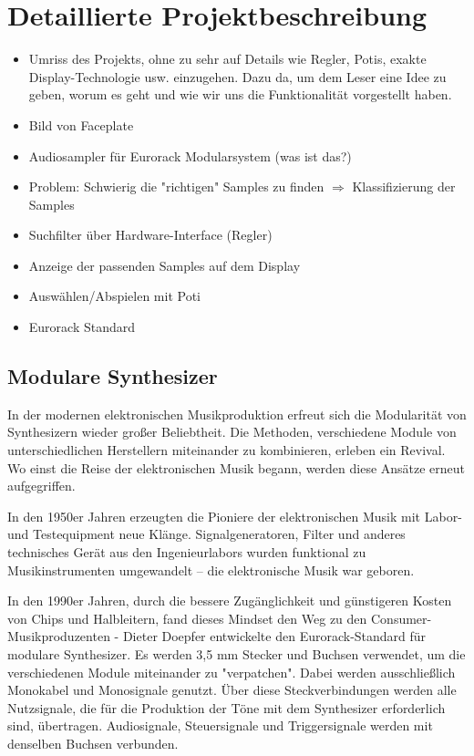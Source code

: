 \newpage
\section{Detaillierte Projektbeschreibung}
\begin{itemize}
    \item Umriss des Projekts, ohne zu sehr auf Details wie Regler, Potis, exakte Display-Technologie usw. einzugehen. Dazu da, um dem Leser eine Idee zu geben, worum es geht und wie wir uns die Funktionalität vorgestellt haben.
    \item Bild von Faceplate
    \item Audiosampler für Eurorack Modularsystem (was ist das?)
    \item Problem: Schwierig die "richtigen" Samples zu finden $\Rightarrow$ Klassifizierung der Samples
    \item Suchfilter über Hardware-Interface (Regler)
    \item Anzeige der passenden Samples auf dem Display
    \item Auswählen/Abspielen mit Poti
    \item Eurorack Standard
\end{itemize}

	\subsection{Modulare Synthesizer}
	
	In der modernen elektronischen Musikproduktion erfreut sich die Modularität von Synthesizern wieder großer Beliebtheit. 
	Die Methoden, verschiedene Module von unterschiedlichen Herstellern miteinander zu kombinieren, erleben ein Revival. 
	Wo einst die Reise der elektronischen Musik begann, werden diese Ansätze erneut aufgegriffen.
	
	In den 1950er Jahren erzeugten die Pioniere der elektronischen Musik mit Labor- und Testequipment neue Klänge. 
	Signalgeneratoren, Filter und anderes technisches Gerät aus den Ingenieurlabors wurden funktional zu Musikinstrumenten umgewandelt – die elektronische Musik war geboren.
	
	In den 1990er Jahren, durch die bessere Zugänglichkeit und günstigeren Kosten von Chips und Halbleitern, fand dieses Mindset den Weg zu den Consumer-Musikproduzenten - Dieter Doepfer entwickelte den Eurorack-Standard für modulare Synthesizer. 
	Es werden 3,5 mm Stecker und Buchsen verwendet, um die verschiedenen Module miteinander zu "verpatchen". 
	Dabei werden ausschließlich Monokabel und Monosignale genutzt. Über diese Steckverbindungen werden alle Nutzsignale, die für die Produktion der Töne mit dem Synthesizer erforderlich sind, übertragen. 
	Audiosignale, Steuersignale und Triggersignale werden mit denselben Buchsen verbunden.
	
